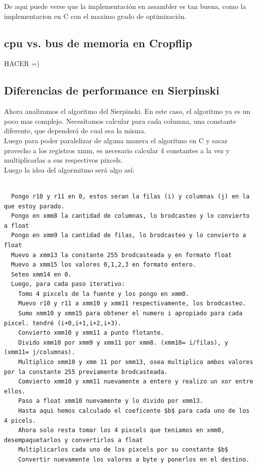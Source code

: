 \documentclass[a4paper]{article}
\begin{document}
De aqui puede verse que la implementación en assambler es tan buena, como la implementacion en C con el maximo grado de optimización.

\subsection{cpu vs. bus de memoria en Cropflip}
HACER =)

\newpage
\subsection{Diferencias de performance en Sierpinski}
Ahora analizamos el algoritmo del Sierpinski. En este caso, el algoritmo ya es un poco mas complejo. Necesitamos calcular para cada columna, una constante diferente, que dependerá de cual sea la misma.
\\
Luego para poder paralelizar de alguna manera el algoritmo en C y sacar provecho a los registros xmm, es necesario calcular 4 constantes a la vez y multiplicarlas a sus respectivos pixcels.
\\
Luego la idea del algormitmo será algo así:
\begin{codesnippet}
\begin{verbatim}

  Pongo r10 y r11 en 0, estos seran la filas (i) y columnas (j) en la que estoy parado.
  Pongo en xmm8 la cantidad de columnas, lo brodcasteo y lo convierto a float
  Pongo en xmm9 la cantidad de filas, lo brodcasteo y lo convierto a float
  Muevo a xmm13 la constante 255 brodcasteada y en formato float
  Muevo a xmm15 los valores 0,1,2,3 en formato entero.
  Seteo xmm14 en 0.
  Luego, para cada paso iterativo:
    Tomo 4 pixcels de la fuente y los pongo en xmm0.
    Muevo r10 y r11 a xmm10 y xmm11 respectivamente, los brodcasteo.
    Sumo xmm10 y xmm15 para obtener el numero i apropiado para cada pixcel. tendré (i+0,i+1,i+2,i+3).
    Convierto xmm10 y xmm11 a punto flotante.
    Divido xmm10 por xmm9 y xmm11 por xmm8. (xmm10= i/filas), y (xmm11= j/columnas).
    Multiplico xmm10 y xmm 11 por xmm13, osea multiplico ambos valores por la constante 255 previamente brodcasteada.
    Comvierto xmm10 y xmm11 nuevamente a entero y realizo un xor entre ellos.
    Paso a float xmm10 nuevamente y lo divido por xmm13.
    Hasta aqui hemos calculado el coeficente $b$ para cada uno de los 4 picels.
    Ahora solo resta tomar los 4 pixcels que teniamos en xmm0, desempaquetarlos y convertirlos a float
    Multiplicarlos cada uno de los pixcels por su constante $b$
    Convertir nuevamente los valores a byte y ponerlos en el destino.
\end{verbatim}
\end{codesnippet}
\end{document}
